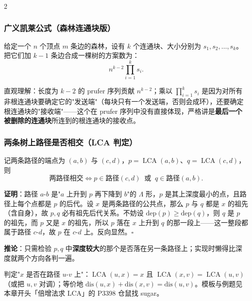 \begin{multicols*}{2}
		\subsubsection{广义凯莱公式（森林连通块版）}

		给定一个 $n$ 个顶点 $m$ 条边的森林，设有 $k$ 个连通块、大小分别为 $s_1, s_2, \dots, s_k$。把它们加 $k - 1$ 条边合成一棵树的方案数为：
		$$
		n^{k-2} \prod_{i=1}^{k} s_i.
		$$

		直观理解：长度为 $k - 2$ 的 prufer 序列贡献 $n^{k - 2}$；乘以 $\prod_{i=1}^{k} s_i$ 是因为对所有非根连通块要确定它的"发送端"（每块只有一个发送端，否则会成环），还要确定根连通块的"接收端"——这个在 prufer 序列中没有直接体现，严格讲是\textbf{最后一个被删除的连通块}所连到的根连通块的接收点。

		\subsubsection{两条树上路径是否相交（LCA 判定）}

		记两条路径的端点为 $(a, b)$ 与 $(c, d)$，$p = \operatorname{LCA}(a, b)$、$q = \operatorname{LCA}(c, d)$，则
		$$
		\text{两路径相交} \iff p \in \text{路径}(c, d) \ \text{ 或 } \ q \in \text{路径}(a, b).
		$$

		\textbf{证明}：路径 $a\text{-}b$ 是"$a$ 上升到 $p$ 再下降到 $b$"的 $\Lambda$ 形，$p$ 是其上深度最小的点，且路径上每个点都是 $p$ 的后代。设 $x$ 是两条路径的公共点，那么 $p$ 与 $q$ 都是 $x$ 的祖先（含自身），故 $p, q$ 必有祖先后代关系。不妨设 $\text{dep}(p) \geq \text{dep}(q)$，则 $q$ 是 $p$ 的祖先，而 $p$ 又是 $x$ 的祖先，所以 $p$ 落在 $x$ 上升到 $q$ 的那一段上——这一整段都属于路径 $c\text{-}d$，故 $p$ 在 $c\text{-}d$ 上。反向显然。$\square$

		\textbf{推论}：只需检验 $p, q$ 中\textbf{深度较大}的那个是否落在另一条路径上；实现时懒得比深度就两个方向各判一遍。

		判定"$x$ 是否在路径 $u\text{-}v$ 上"：$\operatorname{LCA}(u, x) = x$ 且 $\operatorname{LCA}(x, v) = \operatorname{LCA}(u, v)$（或把 $u, v$ 对调）；等价地 $\text{dis}(u, x) + \text{dis}(x, v) = \text{dis}(u, v)$。模板与例题见本章开头「倍增法求 LCA」的 P3398 仓鼠找 sugar。


\end{multicols*}
